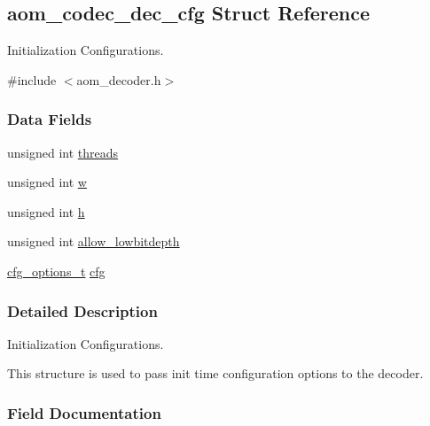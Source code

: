 \hypertarget{structaom__codec__dec__cfg}{}\subsection{aom\+\_\+codec\+\_\+dec\+\_\+cfg Struct Reference}
\label{structaom__codec__dec__cfg}


Initialization Configurations.  




{\ttfamily \#include $<$aom\+\_\+decoder.\+h$>$}

\subsubsection*{Data Fields}
\begin{DoxyCompactItemize}
\item 
unsigned int \hyperlink{structaom__codec__dec__cfg_a48c68337e1071e2aee36c649e579f189}{threads}
\item 
unsigned int \hyperlink{structaom__codec__dec__cfg_a107d66882f85eaaee59e59ea23d974d6}{w}
\item 
unsigned int \hyperlink{structaom__codec__dec__cfg_a441611a22188289243eafa7df433e85f}{h}
\item 
unsigned int \hyperlink{structaom__codec__dec__cfg_afe4d704d679b943d566dcd4fd2276851}{allow\+\_\+lowbitdepth}
\item 
\hyperlink{group__codec_ga58cddec4492c70945a2b4c3773c665b0}{cfg\+\_\+options\+\_\+t} \hyperlink{structaom__codec__dec__cfg_ae47ad67c30783b231e16eee32f573e1d}{cfg}
\end{DoxyCompactItemize}


\subsubsection{Detailed Description}
Initialization Configurations. 

This structure is used to pass init time configuration options to the decoder. 

\subsubsection{Field Documentation}
\mbox{\label{structaom__codec__dec__cfg_a48c68337e1071e2aee36c649e579f189}} 
